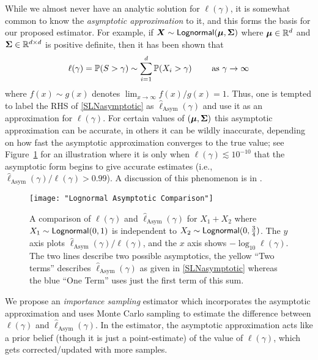 While we almost never have an analytic solution for $\ell(\gamma)$, it is somewhat common to know the \emph{asymptotic approximation} to it, and this forms the basis for our proposed estimator. For example, if $\bm{X} \sim \mathsf{Lognormal}(\bm{\mu}, \bm{\Sigma})$ where $\bm{\mu} \in \mathbb{R}^d$ and $\bm{\Sigma} \in \mathbb{R}^{d \times d}$ is positive definite, then it has been shown that \cite{asmussen2008asymptotics}
\begin{equation} \label{SLNasymptotic}
\ell(\gamma) = \operatorname{{\mathbb P}}(S > \gamma) \sim \sum_{i=1}^d \operatorname{{\mathbb P}}(X_i > \gamma) \qquad \text{ as } \gamma \to \infty
\end{equation}
where $f(x) \sim g(x)$ denotes $\lim_{x \to \infty} f(x)/g(x) = 1$. Thus, one is tempted to label the RHS of \eqref{SLNasymptotic} as $\hat{\ell}_{\mathrm{Asym}}(\gamma)$ and use it as an approximation for $\ell(\gamma)$. For certain values of $(\bm{\mu},\bm{\Sigma})$ this asymptotic approximation can be accurate, in others it can be wildly inaccurate, depending on how fast the asymptotic approximation converges to the true value; see Figure~\ref{fig:slow_convergence} for an illustration where it is only when $\ell(\gamma) \lesssim 10^{-10}$ that the asymptotic form begins to give accurate estimates (i.e., $\hat{\ell}_{\mathrm{Asym}}(\gamma) / \ell(\gamma) > 0.99$). A discussion of this phenomenon is in \cite{botev2017fast}.

\begin{figure}
\centering
\texttt{[image: "Lognormal Asymptotic Comparison"]}
\caption{A comparison of $\ell(\gamma)$ and $\hat{\ell}_{\text{Asym}}(\gamma)$ for $X_1+X_2$ where $X_1 \sim \mathsf{Lognormal}(0, 1)$ is independent to $X_2\sim\mathsf{Lognormal}(0,\frac{3}{4})$. The $y$ axis plots $\hat{\ell}_{\text{Asym}}(\gamma) / \ell(\gamma)$, and the $x$ axis shows ${-}\log_{10} \ell(\gamma)$. The two lines describe two possible asymptotics, the yellow ``Two terms'' describes $\hat{\ell}_{\text{Asym}}(\gamma)$ as given in \eqref{SLNasymptotic} whereas the blue ``One Term'' uses just the first term of this sum.}
\label{fig:slow_convergence}
\end{figure}

We propose an \emph{importance sampling} estimator which incorporates the asymptotic approximation and uses Monte Carlo sampling to estimate the difference between $\ell(\gamma)$ and $\hat{\ell}_{\mathrm{Asym}}(\gamma)$. In the estimator, the asymptotic approximation acts like a prior belief (though it is just a point-estimate) of the value of $\ell(\gamma)$, which gets corrected/updated with more samples.


